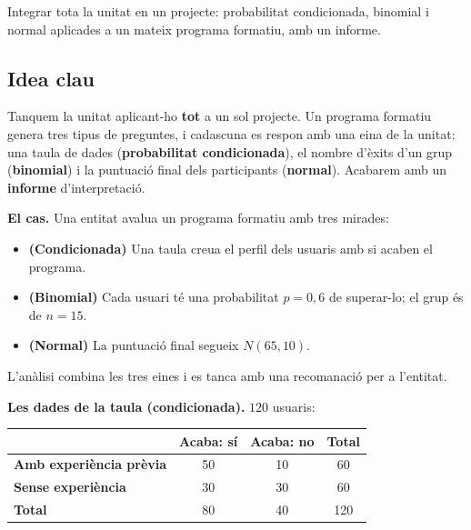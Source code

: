 %
{Integrar tota la unitat en un projecte: probabilitat condicionada, binomial i normal aplicades a un mateix programa formatiu, amb un informe.}

\subsection{Idea clau}

Tanquem la unitat aplicant-ho \textbf{tot} a un sol projecte. Un programa formatiu genera
tres tipus de preguntes, i cadascuna es respon amb una eina de la unitat: una taula de
dades (\textbf{probabilitat condicionada}), el nombre d'èxits d'un grup
(\textbf{binomial}) i la puntuació final dels participants (\textbf{normal}). Acabarem amb
un \textbf{informe} d'interpretació.

\begin{idea}
\textbf{El cas.} Una entitat avalua un programa formatiu amb tres mirades:
\begin{itemize}[leftmargin=1.4em, itemsep=2pt]
  \item \textbf{(Condicionada)} Una taula creua el perfil dels usuaris amb si acaben el
        programa.
  \item \textbf{(Binomial)} Cada usuari té una probabilitat $p=0,6$ de superar-lo; el
        grup és de $n=15$.
  \item \textbf{(Normal)} La puntuació final segueix $N(65,10)$.
\end{itemize}
L'anàlisi combina les tres eines i es tanca amb una recomanació per a l'entitat.
\end{idea}

\noindent\textbf{Les dades de la taula (condicionada).} $120$ usuaris:
\begin{center}
\renewcommand{\arraystretch}{1.3}
\begin{tabular}{l c c c}
\toprule
 & \textbf{Acaba: sí} & \textbf{Acaba: no} & \textbf{Total} \\
\midrule
\textbf{Amb experiència prèvia} & 50 & 10 & 60 \\
\textbf{Sense experiència}      & 30 & 30 & 60 \\
\midrule
\textbf{Total}                  & 80 & 40 & 120 \\
\bottomrule
\end{tabular}
\end{center}

